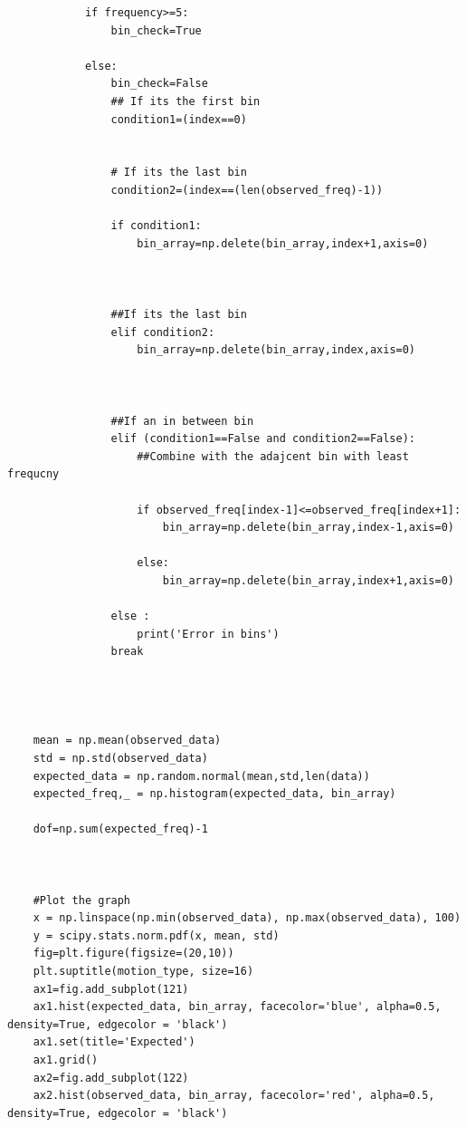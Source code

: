 \begin{itemize}
\begin{verbatim}
            if frequency>=5:
                bin_check=True
                
            else:
                bin_check=False
                ## If its the first bin
                condition1=(index==0)
                
                
                # If its the last bin
                condition2=(index==(len(observed_freq)-1))
                
                if condition1:
                    bin_array=np.delete(bin_array,index+1,axis=0)

                    
                 
                ##If its the last bin
                elif condition2:
                    bin_array=np.delete(bin_array,index,axis=0)

                    
                
                ##If an in between bin
                elif (condition1==False and condition2==False):
                    ##Combine with the adajcent bin with least frequcny 
                 
                    if observed_freq[index-1]<=observed_freq[index+1]:
                        bin_array=np.delete(bin_array,index-1,axis=0)
                        
                    else:
                        bin_array=np.delete(bin_array,index+1,axis=0)
                        
                else :
                    print('Error in bins')
                break                        
                        
  
        
    
    mean = np.mean(observed_data)
    std = np.std(observed_data) 
    expected_data = np.random.normal(mean,std,len(data))  
    expected_freq,_ = np.histogram(expected_data, bin_array)

    dof=np.sum(expected_freq)-1
    
    
    
    #Plot the graph
    x = np.linspace(np.min(observed_data), np.max(observed_data), 100)
    y = scipy.stats.norm.pdf(x, mean, std)    
    fig=plt.figure(figsize=(20,10))
    plt.suptitle(motion_type, size=16)
    ax1=fig.add_subplot(121)
    ax1.hist(expected_data, bin_array, facecolor='blue', alpha=0.5, density=True, edgecolor = 'black')
    ax1.set(title='Expected')
    ax1.grid()
    ax2=fig.add_subplot(122)
    ax2.hist(observed_data, bin_array, facecolor='red', alpha=0.5, density=True, edgecolor = 'black')
    

\end{verbatim}
\end{itemize}
